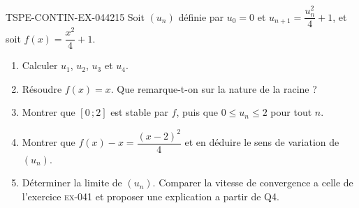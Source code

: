 \begin{exercice}{TSPE-CONTIN-EX-044}{2}{15}
Soit $(u_n)$ définie par $u_0 = 0$ et $u_{n+1} = \dfrac{u_n^2}{4} + 1$, et soit $f(x) = \dfrac{x^2}{4} + 1$.
\begin{enumerate}
  \item Calculer $u_1$, $u_2$, $u_3$ et $u_4$.
  \item Résoudre $f(x) = x$. Que remarque-t-on sur la nature de la racine ?
  \item Montrer que $[0\,;2]$ est stable par $f$, puis que $0 \leq u_n \leq 2$ pour tout $n$.
  \item Montrer que $f(x) - x = \dfrac{(x-2)^2}{4}$ et en déduire le sens de variation de $(u_n)$.
  \item Déterminer la limite de $(u_n)$. Comparer la vitesse de convergence a celle de l'exercice \textsc{ex-041} et proposer une explication a partir de Q4.
\end{enumerate}
\end{exercice}
